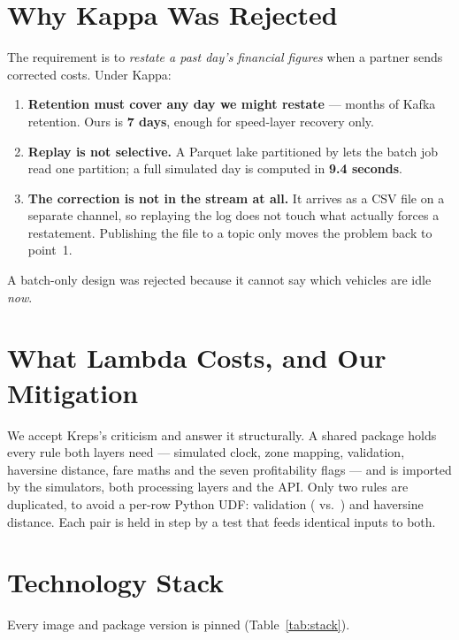 \section{Why Kappa Was Rejected}
\label{sec:kappa-rejected}

The requirement is to \emph{restate a past day's financial figures} when
a partner sends corrected costs. Under Kappa:

\begin{enumerate}
  \item \textbf{Retention must cover any day we might restate} ---
        months of Kafka retention. Ours is \textbf{7 days}, enough for
        speed-layer recovery only.
  \item \textbf{Replay is not selective.} A Parquet lake partitioned by
         lets the batch job read one partition; a full
        simulated day is computed in \textbf{9.4 seconds}.
  \item \textbf{The correction is not in the stream at all.} It arrives
        as a CSV file on a separate channel, so replaying the log does
        not touch what actually forces a restatement. Publishing the
        file to a topic only moves the problem back to point~1.
\end{enumerate}

A batch-only design was rejected because it cannot say which vehicles
are idle \emph{now}.

\section{What Lambda Costs, and Our Mitigation}
\label{sec:lambda-cost}

We accept Kreps's criticism and answer it structurally. A shared
 package holds every rule both layers need --- simulated
clock, zone mapping, validation, haversine distance, fare maths and the
seven profitability flags --- and is imported by the simulators, both
processing layers and the API. Only two rules are duplicated, to avoid a
per-row Python UDF: validation ( vs.\
) and haversine distance. Each pair is
held in step by a test that feeds identical inputs to both.

\section{Technology Stack}
\label{sec:tech-stack}

Every image and package version is pinned (Table~\ref{tab:stack}).

